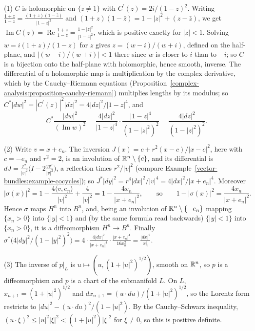 \begin{solution}
(1) $C$ is holomorphic on $\{z \neq 1\}$ with $C^{\prime}(z) = 2i/(1 - z)^2$. Writing $\frac{1 + z}{1 - z} = \frac{(1 + z)(1 - \bar z)}{|1 - z|^2}$ and $(1 + z)(1 - \bar z) = 1 - |z|^2 + (z - \bar z)$, we get
$\operatorname{Im}C(z) = \operatorname{Re}\frac{1 + z}{1 - z} = \frac{1 - |z|^2}{|1 - z|^2}$, which is positive exactly for $|z| < 1$. Solving $w = i(1 + z)/(1 - z)$ for $z$ gives $z = (w - i)/(w + i)$, defined
on the half-plane, and $|(w - i)/(w + i)| < 1$ there since $w$ is closer to $i$ than to $-i$; so $C$ is a bijection onto the half-plane with holomorphic, hence smooth, inverse. The differential of
a holomorphic map is multiplication by the complex derivative, which by the Cauchy--Riemann equations (Proposition~\ref{complex-analysis:proposition-cauchy-riemann}) multiplies lengths by its modulus;
so $C^*|dw|^2 = |C^{\prime}(z)|^2|dz|^2 = 4|dz|^2/|1 - z|^4$, and
\[
C^*\frac{|dw|^2}{(\operatorname{Im}w)^2} = \frac{4|dz|^2}{|1 - z|^4} \cdot \frac{|1 - z|^4}{(1 - |z|^2)^2} = \frac{4|dz|^2}{(1 - |z|^2)^2} .
\]

(2) Write $v = x + e_n$. The inversion $J(x) = c + r^2(x - c)/|x - c|^2$, here with $c = -e_n$ and $r^2 = 2$, is an involution of $\mathbb{R}^n \setminus \{c\}$, and its differential is
$dJ = \frac{r^2}{|v|^2}\bigl(I - 2\frac{vv^T}{|v|^2}\bigr)$, a reflection times $r^2/|v|^2$ (compare Example~\ref{vector-bundles:example-cocycles}); so $J^*|dy|^2 = r^4|dx|^2/|v|^4 = 4|dx|^2/|x + e_n|^4$.
Moreover
\[
|\sigma(x)|^2 = 1 - \frac{4\langle v, e_n\rangle}{|v|^2} + \frac{4}{|v|^2} = 1 - \frac{4x_n}{|x + e_n|^2}, \qquad\text{so}\qquad 1 - |\sigma(x)|^2 = \frac{4x_n}{|x + e_n|^2} .
\]
Hence $\sigma$ maps $H^n$ into $B^n$, and, being an involution of $\mathbb{R}^n \setminus \{-e_n\}$ mapping $\{x_n > 0\}$ into $\{|y| < 1\}$ and (by the same formula read backwards) $\{|y| < 1\}$ into
$\{x_n > 0\}$, it is a diffeomorphism $H^n \to B^n$. Finally
$\sigma^*\bigl(4|dy|^2/(1 - |y|^2)^2\bigr) = 4 \cdot \frac{4|dx|^2}{|x + e_n|^4} \cdot \frac{|x + e_n|^4}{16x_n^2} = \frac{|dx|^2}{x_n^2}$.

(3) The inverse of $p|_L$ is $u \mapsto (u, (1 + |u|^2)^{1/2})$, smooth on $\mathbb{R}^n$, so $p$ is a diffeomorphism and $p$ is a chart of the submanifold $L$. On $L$, $x_{n+1} = (1 + |u|^2)^{1/2}$ and
$dx_{n+1} = (u \cdot du)/(1 + |u|^2)^{1/2}$, so the Lorentz form restricts to $|du|^2 - (u \cdot du)^2/(1 + |u|^2)$. By the Cauchy--Schwarz inequality, $(u \cdot \xi)^2 \leq |u|^2|\xi|^2 < (1 + |u|^2)|\xi|^2$ for
$\xi \neq 0$, so this is positive definite.


\end{solution}
